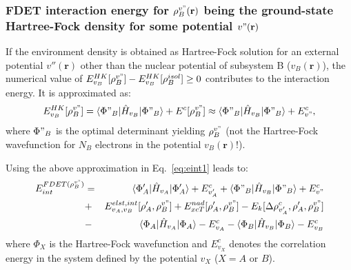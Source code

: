 \documentclass[amsmath,amssymb,preprint,aip,jcp]{revtex4-1}
\begin{document}
\subsubsection{FDET interaction energy for $\rho_B^{v"}(\mathbf{r})$ being the ground-state Hartree-Fock density for some 
 potential $v"(\mathbf{r})$} 
If the environment density is obtained as Hartree-Fock solution for an external potential $v''(\mathbf{r})$ other than the nuclear potential of subsystem B ($v_B(\mathbf{r})$), the numerical value of 
${E}^{HK}_{v_B}[\rho_B^{v"}]-{E}^{HK}_{v_B}[\rho_B^{isol}]\ge 0$ contributes to the interaction energy. 
It is approximated as:
\begin{eqnarray}
{E}^{HK}_{v_B}[\rho_B^{v"}]=\langle\Phi"_{B}\vert \hat{H}_{v_B}\vert \Phi"_{B}\rangle+E^{c}[\rho_B^{v"}] \approx \langle\Phi"_{B}\vert \hat{H}_{v_B}\vert \Phi"_{B}\rangle+E^{c}_{v"}, \label{eq:evb} 
\end{eqnarray}
where $\Phi"_{B}$ is the optimal determinant yielding $\rho_B^{v"}$ (not the Hartree-Fock wavefunction for $N_B$ electrons in the potential ${v_B}(\mathbf{r})$!).

Using the above approximation in Eq.~\ref{eq:eint1} leads to:
 \begin{eqnarray}
E_{int}^{FDET(\rho_B^{v"})} 
&=& \langle\Phi'_{A}\vert \hat{H}_{v_A}\vert \Phi'_{A}\rangle + E^{c}_{v'_A} + \langle\Phi"_{B}\vert \hat{H}_{v_B}\vert \Phi"_{B}\rangle + E^{c}_{v"} \label{eq:eint3}\\ \nonumber
&+& E^{elst,int}_{v_A,v_B}[\rho'_A,\rho_B^{v"}] + {E}_{xcT}^{nad}[\rho'_A,\rho_B^{v"}]- E_k[\Delta \rho^{c}_{v'_A}, \rho'_A, \rho_B^{v"}] \nonumber\\
&-& 
\langle\Phi_{A}\vert \hat{H}_{v_A}\vert \Phi_{A}\rangle - E^{c}_{v_A}
- \langle\Phi_{B}\vert \hat{H}_{v_B}\vert \Phi_{B}\rangle - E^{c}_{v_B}\nonumber
\end{eqnarray}
where $\Phi_{X}$ is the Hartree-Fock wavefunction and $E^{c}_{v_X}$ denotes the correlation energy in the system defined by the potential $v_X$ ($X=A$ or $B$).
\end{document}
